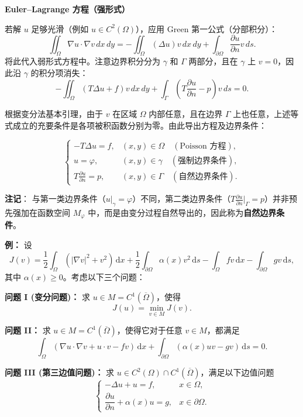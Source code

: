 \documentclass[12pt,a4paper]{ctexart}
\begin{document}
	\medskip
	\textbf{Euler--Lagrange 方程（强形式）}
	
	若解 $u$ 足够光滑（例如 $u \in C^2(\Omega)$），应用 Green 第一公式（分部积分）：
	\[
	\iint_{\Omega} \nabla u \cdot \nabla v \,dx\,dy = - \iint_{\Omega} (\Delta u) v \,dx\,dy + \int_{\partial\Omega} \frac{\partial u}{\partial n} v \,ds.
	\]
	将此代入弱形式方程中。注意边界积分分为 $\gamma$ 和 $\Gamma$ 两部分，且在 $\gamma$ 上 $v=0$，因此沿 $\gamma$ 的积分项消失：
	\[
	-\iint_{\Omega} (T \Delta u + f) v \,dx\,dy + \int_{\Gamma} \left( T \frac{\partial u}{\partial n} - p \right) v \,ds = 0.
	\]
	
	根据变分法基本引理，由于 $v$ 在区域 $\Omega$ 内部任意，且在边界 $\Gamma$ 上也任意，上述等式成立的充要条件是各项被积函数分别为零。由此导出方程及边界条件：
	
	\[
	\begin{cases}
		-T \Delta u = f, & (x,y) \in \Omega \quad (\text{Poisson 方程}), \\
		u = \varphi, & (x,y) \in \gamma \quad (\text{强制边界条件}), \\
		\displaystyle T \frac{\partial u}{\partial n} = p, & (x,y) \in \Gamma \quad (\text{自然边界条件}).
	\end{cases}
	\]
	
	\medskip
	\textbf{注记}：
	与第一类边界条件（$u|_\gamma=\varphi$）不同，第二类边界条件（$T \frac{\partial u}{\partial n}|_\Gamma = p$）并非预先强加在函数空间 $M_\varphi$ 中，而是由变分过程自然导出的，因此称为\textbf{自然边界条件}。
	\vspace{3cm}
	
	\textbf{例：}
	设
	\[
	J(v) = \frac{1}{2}\int_{\Omega} (|\nabla v|^2 + v^2) \,\mathrm{d}x + \frac{1}{2}\int_{\partial\Omega} \alpha(x)v^2 \,\mathrm{d}s - \int_{\Omega} fv \,\mathrm{d}x - \int_{\partial\Omega} gv \,\mathrm{d}s,
	\]
	其中 $\alpha(x) \geqslant 0$。考虑以下三个问题：
	
	\noindent\textbf{问题 I (变分问题)：} 求 $u \in M = C^1(\overline{\Omega})$，使得
	\[
	J(u) = \min_{v \in M} J(v).
	\]
	
	\noindent\textbf{问题 II：} 求 $u \in M = C^1(\overline{\Omega})$，使得它对于任意 $v \in M$，都满足
	\[
	\int_{\Omega} (\nabla u \cdot \nabla v + u \cdot v - fv) \,\mathrm{d}x + \int_{\partial\Omega} (\alpha(x)uv - gv) \,\mathrm{d}s = 0.
	\]
	
	\noindent\textbf{问题 III (第三边值问题)：} 求 $u \in C^2(\Omega) \cap C^1(\overline{\Omega})$，满足以下边值问题
	\[
	\begin{cases}
		-\Delta u + u = f, & x \in \Omega, \\
		\dfrac{\partial u}{\partial n} + \alpha(x)u = g, & x \in \partial\Omega.
	\end{cases}
	\]
	
\end{document}
